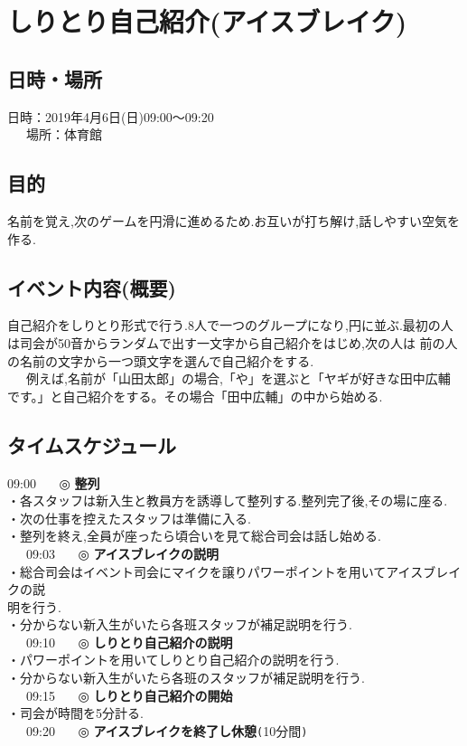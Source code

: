\documentclass[a4j]{jarticle}
\begin{document}
\section{しりとり自己紹介(アイスブレイク)}
\subsection{日時・場所}
日時：2019年4月6日(日)09:00〜09:20\\
\ \ \ 場所：体育館\\
\subsection{目的}
名前を覚え,次のゲームを円滑に進めるため.お互いが打ち解け,話しやすい空気を作る.
\subsection{イベント内容(概要)}
自己紹介をしりとり形式で行う.8人で一つのグループになり,円に並ぶ.最初の人は司会が50音からランダムで出す一文字から自己紹介をはじめ,次の人は
前の人の名前の文字から一つ頭文字を選んで自己紹介をする.\\
\ \ \ 例えば,名前が「山田太郎」の場合,「や」を選ぶと「ヤギが好きな田中広輔です。」と自己紹介をする。その場合「田中広輔」の中から始める.
\subsection{タイムスケジュール}
09:00 \ \ \ ◎ \textbf{整列} \\
\hspace{15mm}・各スタッフは新入生と教員方を誘導して整列する.整列完了後,その場に座る.\\
\hspace{15mm}・次の仕事を控えたスタッフは準備に入る.\\
\hspace{15mm}・整列を終え,全員が座ったら頃合いを見て総合司会は話し始める.\\
\ \ \ 09:03 \ \ \ ◎ \textbf{アイスブレイクの説明}\\
\hspace{15mm}・総合司会はイベント司会にマイクを譲りパワーポイントを用いてアイスブレイクの説\\
\hspace{15mm}明を行う.\\
\hspace{15mm}・分からない新入生がいたら各班スタッフが補足説明を行う.\\
\ \ \ 09:10 \ \ \ ◎ \textbf{しりとり自己紹介の説明}\\
\hspace{15mm}・パワーポイントを用いてしりとり自己紹介の説明を行う.\\
\hspace{15mm}・分からない新入生がいたら各班のスタッフが補足説明を行う.\\
\ \ \ 09:15 \ \ \ ◎ \textbf{しりとり自己紹介の開始}\\
\hspace{15mm}・司会が時間を5分計る.\\
\ \ \ 09:20 \ \ \ ◎ \textbf{アイスブレイクを終了し休憩}\verb+(+10分間\verb+)+
\end{document}
